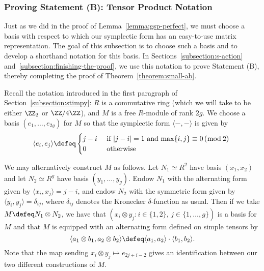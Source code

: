 \subsubsection{Proving Statement (B): Tensor Product Notation}\label{tomswifties}

Just as we did in the proof of Lemma~\ref{lemma:gsp-perfect}, we must choose a basis with respect to which our symplectic form has an easy-to-use matrix representation. The goal of this subsection is to choose such a basis and to develop a shorthand notation for this basis. In Sections~\ref{subsection:s-action} and~\ref{subsection:finishing-the-proof}, we use this notation to prove Statement (B), thereby completing the proof of Theorem~\ref{theorem:small-ab}.

Recall the notation introduced in the first paragraph of Section~\ref{subsection:stimpy}: $R$ is a commutative ring (which we will take to be either $\ZZ_2$ or $\ZZ/4\ZZ$), and $M$ is a free $R$-module of rank $2g$. We choose a basis $(e_1, \ldots, e_{2g})$ for $M$ so that the symplectic form $\langle -, -\rangle$ is given by
$$\langle e_i , e_j \rangle \defeq \begin{cases} j-i & \text{ if $|j-i| = 1$ and $\max\{i,j\} \equiv 0\,(\bmod\,2$) } \\ 0 & \text{ otherwise} \end{cases}$$

We may alternatively construct $M$ as follows. Let $N_1 \simeq R^{2}$ have basis $(x_1, x_2)$ and let $N_2 \simeq R^{g}$ have basis $(y_1, \ldots, y_g)$. Endow $N_1$ with the alternating form given by $\langle x_i, x_j \rangle = j - i$, and endow $N_2$ with the symmetric form given by $\langle y_i, y_j \rangle = \delta_{ij}$, where $\delta_{ij}$ denotes the Kronecker $\delta$-function as usual. Then if we take $M \defeq N_1 \otimes N_2$, we have that $(x_i \otimes y_j : i \in \{1,2\}, \, j \in \{1, \dots, g\} )$ is a basis for $M$ and that $M$ is equipped with an alternating form defined on simple tensors by
\[
\langle a_1 \otimes b_1, a_2 \otimes b_2 \rangle \defeq \langle a_1, a_2 \rangle \cdot \langle b_1, b_2 \rangle. 
\]
Note that the map sending $x_i \otimes y_j \mapsto e_{2j + i - 2}$ gives an identification between our two different constructions of $M$.

